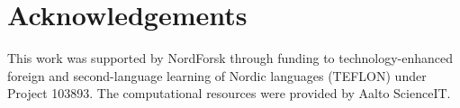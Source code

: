 \documentclass{article}
\begin{document}
\section{Acknowledgements}
\label{sec:acknowledgements}

This work was supported by NordForsk through funding to technology-enhanced foreign and second-language learning of Nordic
languages (TEFLON) under Project 103893. The computational resources were provided by Aalto
ScienceIT.

%
%
\printbibliography
\end{document}
